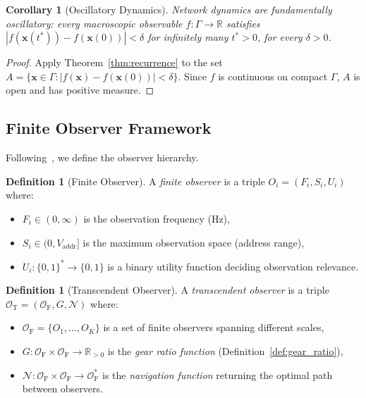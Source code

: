 \documentclass[11pt,twocolumn,a4paper]{article}
\newtheorem{corollary}[theorem]{Corollary}
\theoremstyle{definition}
\newtheorem{definition}[theorem]{Definition}
\theoremstyle{remark}
\newcommand{\Vaddr}{V_{\mathrm{addr}}}
\newcommand{\OT}{\mathcal{O}_{\mathrm{T}}}
\newcommand{\OF}{\mathcal{O}_{\mathrm{F}}}
\begin{document}
\begin{corollary}[Oscillatory Dynamics]\label{cor:oscillatory}
Network dynamics are fundamentally oscillatory: every macroscopic observable
$f:\Gamma\to\mathbb{R}$ satisfies $|f(\bm{x}(t^{*}))-f(\bm{x}(0))|<\delta$
for infinitely many $t^{*}>0$, for every $\delta>0$.
\end{corollary}

\begin{proof}
Apply Theorem~\ref{thm:recurrence} to the set
$A=\{\bm{x}\in\Gamma:|f(\bm{x})-f(\bm{x}(0))|<\delta\}$.  Since $f$ is
continuous on compact $\Gamma$, $A$ is open and has positive measure.
\end{proof}

\subsection{Finite Observer Framework}\label{sec:finite_observer}

Following~\cite{Sachikonye2024a,Sachikonye2024b}, we define the observer
hierarchy.

\begin{definition}[Finite Observer]\label{def:finite_observer}
A \emph{finite observer} is a triple $O_i = (F_i, S_i, U_i)$ where:
\begin{itemize}
  \item $F_i\in(0,\infty)$ is the observation frequency (Hz),
  \item $S_i\in(0,\Vaddr]$ is the maximum observation space (address range),
  \item $U_i:\{0,1\}^{*}\to\{0,1\}$ is a binary utility function deciding
        observation relevance.
\end{itemize}
\end{definition}

\begin{definition}[Transcendent Observer]\label{def:transcendent}
A \emph{transcendent observer} is a triple
$\OT = (\OF, G, \mathcal{N})$ where:
\begin{itemize}
  \item $\OF=\{O_1,\ldots,O_K\}$ is a set of finite observers spanning
        different scales,
  \item $G:\OF\times\OF\to\mathbb{R}_{>0}$ is the \emph{gear ratio function}
        (Definition~\ref{def:gear_ratio}),
  \item $\mathcal{N}:\OF\times\OF\to\OF^{*}$ is the \emph{navigation function}
        returning the optimal path between observers.
\end{itemize}
\end{definition}
\end{document}
